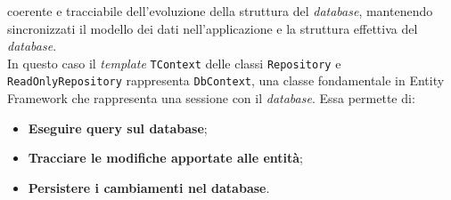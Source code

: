 coerente e tracciabile dell'evoluzione della struttura del \textit{database}, mantenendo sincronizzati il modello dei 
dati nell'applicazione e la struttura effettiva del \textit{database}.\\
In questo caso il \textit{template} \texttt{TContext} delle classi \texttt{Repository} e \texttt{ReadOnlyRepository} 
rappresenta \texttt{DbContext}, una classe fondamentale in Entity Framework che rappresenta una sessione con il 
\textit{database}. Essa permette di:
\begin{itemize}
      \item \textbf{Eseguire query sul database};
      \item \textbf{Tracciare le modifiche apportate alle entità};
      \item \textbf{Persistere i cambiamenti nel database}.
\end{itemize}


